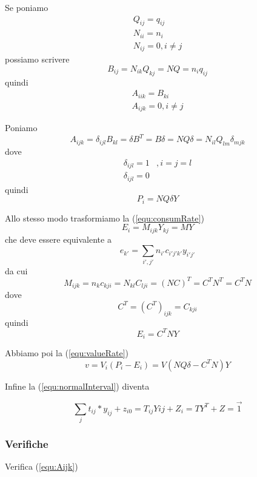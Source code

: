 \documentclass[a4paper,11pt]{article}
\begin{document}
Se poniamo
\[
\begin{array}{ll}
	Q_{ij} = q_{ij} \\
	N_{ii} = n_i \\
	N_{ij} = 0, i \ne j
\end{array}
\]
possiamo scrivere
\[
	B_{ij} = N_{ik} Q_{kj} = N Q = n_{i} q_{ij}
\]
quindi
\[
\begin{array}{ll}
	A_{iik} = B_{ki}\\
	A_{ijk} = 0, i \ne j
\end{array}
\]

Poniamo
\begin{equation}
\label{equ:NQI}
	A_{ijk} = \delta_{ijl} B_{kl} = \delta B^T = B \delta =
		N Q \delta = N_{il} Q_{lm} \delta_{mjk}
\end{equation}
dove
\[
\begin{array}{ll}
	\delta_{ijl} = 1 & , i = j = l \\
	\delta_{ijl} = 0
\end{array}
\]
quindi
\[
	P_i = N Q \delta Y
\]

Allo stesso modo trasformiamo la (\ref{equ:consumRate})
\[
	E_i = M_{ijk} Y_{kj} = M Y
\]
che deve essere equivalente a
\begin{equation}
\label{equ:e_k}
	e_{k'} = \sum_{i', j'} n_{i'} c_{i'j'k'} y_{i'j'}
\end{equation}
da cui
\begin{equation}
\label{equ:Mijk}
	M_{ijk} = n_k c_{kji} = N_{kl} C_{lji} = (NC)^T = C^T N^T = C^T N
\end{equation}
dove
\[
	C^T = (C^T)_{ijk} = C_{kji}
\]
quindi
\[
	E_i = C^T N Y
\]

Abbiamo poi la (\ref{equ:valueRate})
\[
	v = V_i (P_i - E_i)
	= V \left( N Q \delta - C^T N \right) Y
\]

Infine la (\ref{equ:normalInterval}) diventa

\begin{equation}
	\sum_j t_{ij} * y_{ij} + z_{i0} = T_{ij} Y{ij} + Z_i = T Y^T + Z = \vec{1}
\end{equation}


\subsubsection{Verifiche}

Verifica (\ref{equ:Aijk})
\end{document}
